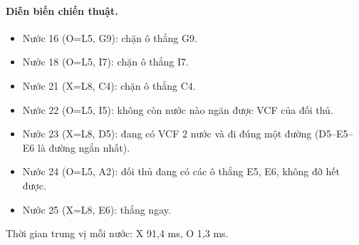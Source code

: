 \paragraph{Diễn biến chiến thuật.}
\begin{itemize}\footnotesize\linespread{1.1}\selectfont
\setlength{\itemsep}{0pt}
  \item Nước 16 (O=L5, G9): chặn ô thắng G9.
  \item Nước 18 (O=L5, I7): chặn ô thắng I7.
  \item Nước 21 (X=L8, C4): chặn ô thắng C4.
  \item Nước 22 (O=L5, I5): không còn nước nào ngăn được VCF của đối thủ.
  \item Nước 23 (X=L8, D5): đang có VCF 2 nước và đi đúng một đường (D5--E5--E6 là đường ngắn nhất).
  \item Nước 24 (O=L5, A2): đối thủ đang có các ô thắng E5, E6, không đỡ hết được.
  \item Nước 25 (X=L8, E6): thắng ngay.
\end{itemize}
Thời gian trung vị mỗi nước: X 91,4 ms, O 1,3 ms.
\clearpage

